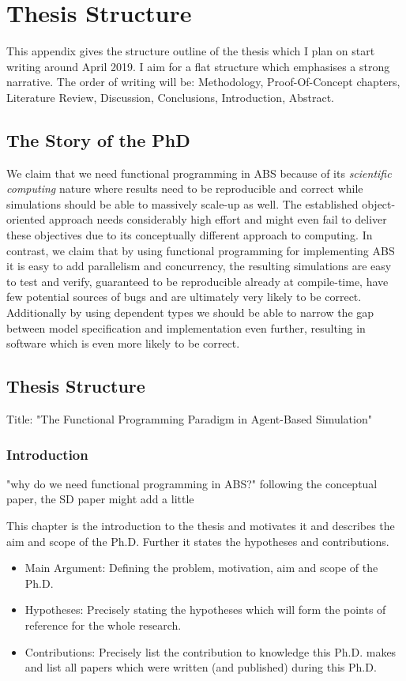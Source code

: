 \chapter{Thesis Structure}
\label{app:thesis_struct}

This appendix gives the structure outline of the thesis which I plan on start writing around April 2019. I aim for a flat structure which emphasises a strong narrative. The order of writing will be: Methodology, Proof-Of-Concept chapters, Literature Review, Discussion, Conclusions, Introduction, Abstract.

\section{The Story of the PhD}
We claim that we need functional programming in ABS because of its \textit{scientific computing} nature where results need to be reproducible and correct while simulations should be able to massively scale-up as well. The established object-oriented approach needs considerably high effort and might even fail to deliver these objectives due to its conceptually different approach to computing. In contrast, we claim that by using functional programming for implementing ABS it is easy to add parallelism and concurrency, the resulting simulations are easy to test and verify, guaranteed to be reproducible already at compile-time, have few potential sources of bugs and are ultimately very likely to be correct. Additionally by using dependent types we should be able to narrow the gap between model specification and implementation even further, resulting in software which is even more likely to be correct. 

\section{Thesis Structure}
Title: "The Functional Programming Paradigm in Agent-Based Simulation"

\subsection{Introduction}
"why do we need functional programming in ABS?" following the conceptual paper, the SD paper might add a little

This chapter is the introduction to the thesis and motivates it and describes the aim and scope of the Ph.D. Further it states the hypotheses and contributions.
\begin{itemize}
	\item Main Argument: Defining the problem, motivation, aim and scope of the Ph.D.
	\item Hypotheses: Precisely stating the hypotheses which will form the points of reference for the whole research.
	\item Contributions: Precisely list the contribution to knowledge this Ph.D. makes and list all papers which were written (and published) during this Ph.D.
\end{itemize}

